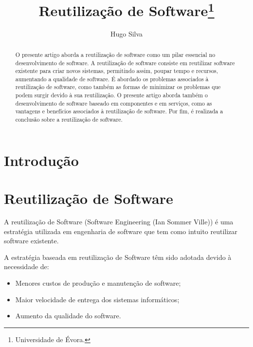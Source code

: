 \documentclass[runningheads]{llncs}
\begin{document}
%
\title{Reutilização de Software\thanks{Universidade de Évora.}}
%
%
\author{Hugo Silva }

%
%
%
\maketitle              %
%
\begin{abstract}

O presente artigo aborda a reutilização de software como um pilar essencial no desenvolvimento de software. A reutilização de software consiste em reutilizar software existente para criar novos sistemas, permitindo assim, poupar tempo e recursos, aumentando a qualidade de software. É abordado os problemas associados à reutilização de software, como também as formas de minimizar os problemas que podem surgir devido à sua reutilização. O presente artigo aborda também o desenvolvimento de software baseado em componentes e em serviços, como as vantagens e benefícios associados à reutilização de software. Por fim, é realizada a conclusão sobre a reutilização de software.

\end{abstract}
%
%
%
\section{Introdução}

\section{Reutilização de Software}

A reutilização de Software (Software Engineering (Ian Sommer Ville)) é uma estratégia utilizada em engenharia de software que tem como intuito reutilizar software existente.\par
A estratégia baseada em reutilização de Software têm sido adotada devido à necessidade de:


\begin{itemize}
    \item Menores custos de produção e manutenção de software;
    \item Maior velocidade de entrega dos sistemas informáticos;
    \item Aumento da qualidade do software.
\end{itemize}
\end{document}
